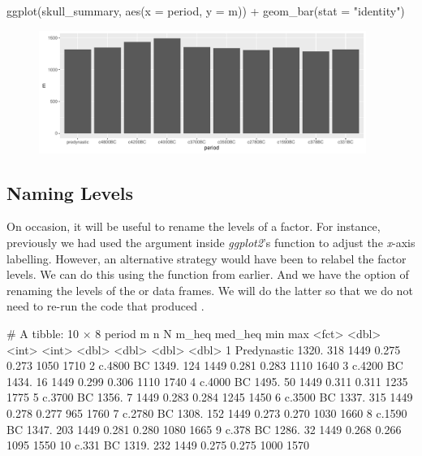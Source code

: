 \begin{inR}
ggplot(skull_summary, aes(x = period, y = m)) +
  geom_bar(stat = "identity")
\end{inR}

\vspace{2em}

\begin{figure}[H]
\includegraphics[width = 0.95\textwidth]{graphics/ch3Figs/bar_6.pdf}
\end{figure}

\subsection{Naming Levels}

On occasion, it will be useful to rename the levels of a factor. For instance, previously we had used the  argument inside \textit{ggplot2}'s  function to adjust the \textit{x}-axis labelling. However, an alternative strategy would have been to relabel the factor levels. We can do this using the  function from earlier. And we have the option of renaming the levels of the  or  data frames. We will do the latter so that we do not need to re-run the code that produced .

\begin{outR}
# A tibble: 10 × 8
   period          m     n     N m_heq med_heq   min   max
   <fct>       <dbl> <int> <int> <dbl>   <dbl> <dbl> <dbl>
 1 Predynastic 1320.   318  1449 0.275   0.273  1050  1710
 2 c.4800 BC   1349.   124  1449 0.281   0.283  1110  1640
 3 c.4200 BC   1434.    16  1449 0.299   0.306  1110  1740
 4 c.4000 BC   1495.    50  1449 0.311   0.311  1235  1775
 5 c.3700 BC   1356.     7  1449 0.283   0.284  1245  1450
 6 c.3500 BC   1337.   315  1449 0.278   0.277   965  1760
 7 c.2780 BC   1308.   152  1449 0.273   0.270  1030  1660
 8 c.1590 BC   1347.   203  1449 0.281   0.280  1080  1665
 9 c.378 BC    1286.    32  1449 0.268   0.266  1095  1550
10 c.331 BC    1319.   232  1449 0.275   0.275  1000  1570
\end{outR}

